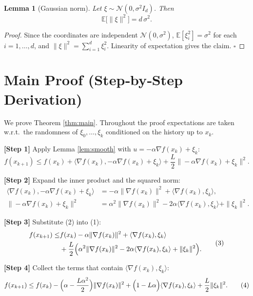 \documentclass[11pt]{article}
\newtheorem{lemma}{Lemma}
\newcommand{\E}{\mathbb{E}}
\begin{document}
\begin{lemma}[Gaussian norm]\label{lem:gauss}
Let $\xi\sim\mathcal N(0,\sigma^{2}I_{d})$. Then
\[
\E\!\bigl[\|\xi\|^{2}\bigr]=d\,\sigma^{2}.
\]
\end{lemma}
\begin{proof}
Since the coordinates are independent $\mathcal N(0,\sigma^{2})$, $\E[\xi_{i}^{2}]=\sigma^{2}$ for each $i=1,\dots,d$, and $\|\xi\|^{2}=\sum_{i=1}^{d}\xi_{i}^{2}$. Linearity of expectation gives the claim. \hfill $\square$
\end{proof}

\section*{Main Proof (Step‑by‑Step Derivation)}
We prove Theorem \ref{thm:main}. Throughout the proof expectations are taken w.r.t.\ the randomness of $\xi_{0},\dots,\xi_{k}$ conditioned on the history up to $x_{k}$.

\bigskip
\noindent\textbf{[Step 1]} Apply Lemma \ref{lem:smooth} with $u= -\alpha\nabla f(x_{k})+\xi_{k}$:
\[
f(x_{k+1})\le f(x_{k})+\big\langle\nabla f(x_{k}),-\alpha\nabla f(x_{k})+\xi_{k}\big\rangle
+\frac{L}{2}\big\|-\alpha\nabla f(x_{k})+\xi_{k}\big\|^{2}.
\tag{1}
\]

\noindent\textbf{[Step 2]} Expand the inner product and the squared norm:
\[
\begin{aligned}
\big\langle\nabla f(x_{k}),-\alpha\nabla f(x_{k})+\xi_{k}\big\rangle
&= -\alpha\|\nabla f(x_{k})\|^{2}+\langle\nabla f(x_{k}),\xi_{k}\rangle,\\[4pt]
\big\|-\alpha\nabla f(x_{k})+\xi_{k}\big\|^{2}
&= \alpha^{2}\|\nabla f(x_{k})\|^{2}-2\alpha\langle\nabla f(x_{k}),\xi_{k}\rangle+\|\xi_{k}\|^{2}.
\end{aligned}
\tag{2}
\]

\noindent\textbf{[Step 3]} Substitute (2) into (1):
\[
\begin{aligned}
f(x_{k+1})\le &
f(x_{k})-\alpha\|\nabla f(x_{k})\|^{2}
+\langle\nabla f(x_{k}),\xi_{k}\rangle\\
&+\frac{L}{2}\Bigl(\alpha^{2}\|\nabla f(x_{k})\|^{2}
-2\alpha\langle\nabla f(x_{k}),\xi_{k}\rangle
+\|\xi_{k}\|^{2}\Bigr).
\end{aligned}
\tag{3}
\]

\noindent\textbf{[Step 4]} Collect the terms that contain $\langle\nabla f(x_{k}),\xi_{k}\rangle$:
\[
f(x_{k+1})\le f(x_{k})
-\Bigl(\alpha-\frac{L\alpha^{2}}{2}\Bigr)\|\nabla f(x_{k})\|^{2}
+\Bigl(1-L\alpha\Bigr)\langle\nabla f(x_{k}),\xi_{k}\rangle
+\frac{L}{2}\|\xi_{k}\|^{2}.
\tag{4}
\]
\end{document}
